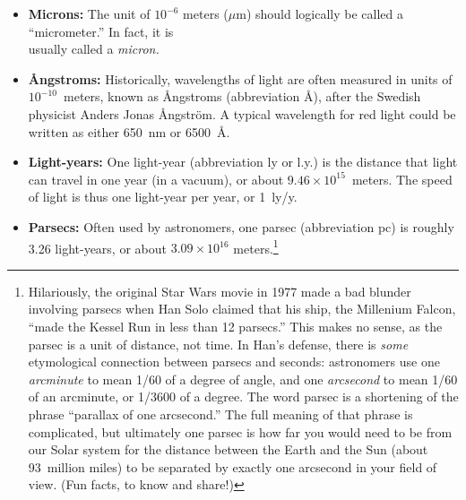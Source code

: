 \begin{itemize}

\item \textbf{Microns:} The unit of $10^{-6}$ meters ($\mu$m) should logically be called a ``micrometer.''  In fact, it is\\
usually called a \textit{micron.}

\item \textbf{{\AA}ngstroms:} Historically, wavelengths of light are often measured in units of $10^{-10}$~meters, known as \AA ngstroms (abbreviation \AA), after the Swedish physicist Anders Jonas {\AA}ngstr\"{o}m.  A typical wavelength for red light could be written as either 650~nm or 6500~\AA.

\item \textbf{Light-years:} One light-year (abbreviation ly or l.y.) is the distance that light can travel in one year (in a vacuum), or about $9.46\times10^{15}$~meters.  The speed of light is thus one light-year per year, or 1~ly/y.

\item \textbf{Parsecs:} Often used by astronomers, one parsec (abbreviation pc) is roughly 3.26 light-years, or about $3.09\times10^{16}$ meters.\footnote{Hilariously, the original Star Wars movie in 1977 made a bad blunder involving parsecs when Han Solo claimed that his ship, the Millenium Falcon, ``made the Kessel Run in less than 12 parsecs.''  
This makes no sense, as the parsec is a unit of distance, not time.  In Han's defense, there is \textit{some} etymological connection between parsecs and seconds: astronomers use one \textit{arcminute} to mean 1/60 of a degree of angle, and one \textit{arcsecond} to mean 1/60 of an arcminute, or 1/3600 of a degree.  
The word parsec is a shortening of the phrase ``parallax of one arcsecond.'' The full meaning of that phrase is complicated, but ultimately one parsec is how far you would need to be from our Solar system for the distance between the Earth and the Sun (about 93~million miles) to be separated by exactly one arcsecond in your field of view.  (Fun facts, to know and share!)
}

\end{itemize}